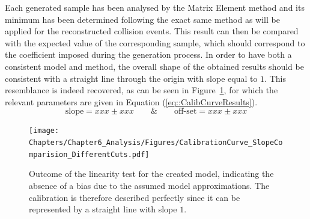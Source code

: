 %
Each generated sample has been analysed by the Matrix Element method and its minimum has been determined following the exact same method as will be applied for the reconstructed collision events.
This result can then be compared with the expected value of the corresponding sample, which should correspond to the coefficient imposed during the generation process.
In order to have both a consistent model and method, the overall shape of the obtained results should be consistent with a straight line through the origin with slope equal to $1$.
This resemblance is indeed recovered, as can be seen in Figure~\ref{fig::CalibCurve}, for which the relevant parameters are given in Equation (\ref{eq::CalibCurveResults}).
\begin{equation} \label{eq::CalibCurveResults}
 \textrm{slope} = xxx \pm xxx \qquad \& \qquad \textrm{off-set} = xxx \pm xxx  
\end{equation}
\begin{figure}[h!t]
 \centering
 \texttt{[image: Chapters/Chapter6\_Analysis/Figures/CalibrationCurve\_SlopeComparision\_DifferentCuts.pdf]}
 \caption{Outcome of the linearity test for the created model, indicating the absence of a bias due to the assumed model approximations. The calibration is therefore described perfectly since it can be represented by a straight line with slope $1$.} \label{fig::CalibCurve}
\end{figure}

